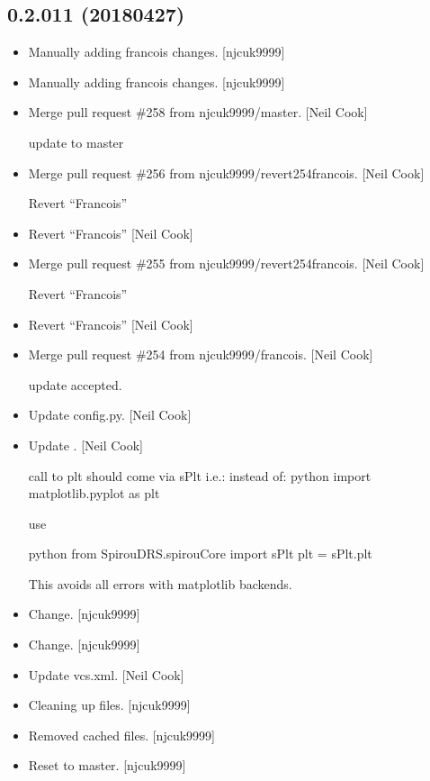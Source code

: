 \documentclass[a4paper,10pt,english]{report}
\begin{document}
\subsection{0.2.011 (2018\sphinxhyphen{}04\sphinxhyphen{}27)}
\label{\detokenize{misc/changelog:id470}}\begin{itemize}
\item {} 
Manually adding francois changes. {[}njcuk9999{]}

\item {} 
Manually adding francois changes. {[}njcuk9999{]}

\item {} 
Merge pull request \#258 from njcuk9999/master. {[}Neil Cook{]}

update to master

\item {} 
Merge pull request \#256 from njcuk9999/revert\sphinxhyphen{}254\sphinxhyphen{}francois. {[}Neil
Cook{]}

Revert “Francois”

\item {} 
Revert “Francois” {[}Neil Cook{]}

\item {} 
Merge pull request \#255 from njcuk9999/revert\sphinxhyphen{}254\sphinxhyphen{}francois. {[}Neil
Cook{]}

Revert “Francois”

\item {} 
Revert “Francois” {[}Neil Cook{]}

\item {} 
Merge pull request \#254 from njcuk9999/francois. {[}Neil Cook{]}

update accepted.

\item {} 
Update config.py. {[}Neil Cook{]}

\item {} 
Update . {[}Neil Cook{]}

call to plt should come via sPlt i.e.:
instead of:
python
import matplotlib.pyplot as plt

use

python
from SpirouDRS.spirouCore import sPlt
plt = sPlt.plt

This avoids all errors with matplotlib backends.

\item {} 
Change. {[}njcuk9999{]}

\item {} 
Change. {[}njcuk9999{]}

\item {} 
Update vcs.xml. {[}Neil Cook{]}

\item {} 
Cleaning up files. {[}njcuk9999{]}

\item {} 
Removed cached files. {[}njcuk9999{]}

\item {} 
Reset to master. {[}njcuk9999{]}

\end{itemize}
\end{document}
